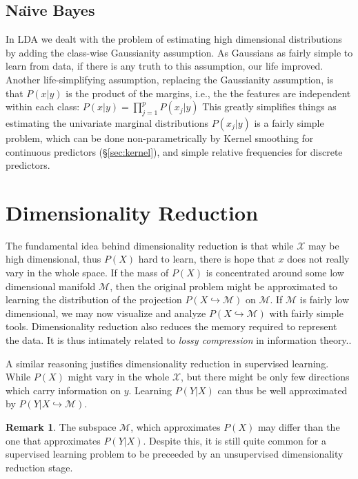 \documentclass[12pt,a4paper]{article}
\theoremstyle{plain}
\theoremstyle{definition}
\newtheorem{remark}{Remark}
\newcommand{\Naive}{Na\"{\i}ve }
\newcommand{\dist}{P}
\newcommand{\featureS}{\mathcal{X}}
\newcommand{\manifold}{\mathcal{M}}
\newcommand{\project}{\hookrightarrow}
\begin{document}
\subsection{\Naive Bayes}
\label{sec:naive_bayes}
In LDA we dealt with the problem of estimating high dimensional distributions by adding the class-wise Gaussianity assumption. As Gaussians as fairly simple to learn from data, if there is any truth to this assumption, our life improved. 
Another life-simplifying assumption, replacing the Gaussianity assumption, is that $\dist(x|y)$ is the product of the margins, i.e., the the features are independent within each class: $\dist(x|y)=\prod_{j=1}^p\dist(x_j|y)$
This greatly simplifies things as estimating the univariate marginal distributions $\dist(x_j|y)$ is a fairly simple problem, which can be done non-parametrically by Kernel smoothing for continuous predictors (\S\ref{sec:kernel}), and simple relative frequencies for discrete predictors. 


\section{Dimensionality Reduction}
\label{sec:dim_reduce}
The fundamental idea behind dimensionality reduction is that while $\featureS$ may be high dimensional, thus $\dist(X)$ hard to learn, there is hope that $x$ does not really vary in the whole space. 
If the mass of $\dist(X)$ is concentrated around some low dimensional manifold $\manifold$, then the original problem might be approximated to learning the distribution of the projection $\dist(X \project \manifold)$ on $\manifold$. 
If $\manifold$ is fairly low dimensional, we may now visualize and analyze $\dist(X \project \manifold)$ with fairly simple tools.
Dimensionality reduction also reduces the memory required to represent the data. It is thus intimately related to \emph{lossy compression} in information theory..

A similar reasoning justifies dimensionality reduction in supervised learning. While $\dist(X)$ might vary in the whole $\featureS$, but there might be only few directions which carry information on $y$. Learning $\dist(Y|X)$ can thus be well approximated by $\dist(Y|X \project \manifold)$.


\begin{remark}
The subspace $\manifold$, which approximates $\dist(X)$ may differ than the one that approximates $\dist(Y|X)$. Despite this, it is still quite common for a supervised learning problem to be preceeded by an unsupervised dimensionality reduction stage.
\end{remark}
\end{document}
